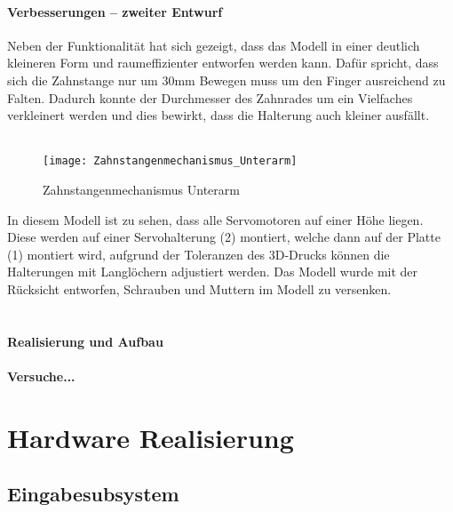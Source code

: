 \documentclass[titlepage,12pt,twoside]{article}
\begin{document}
\paragraph{Verbesserungen – zweiter Entwurf}
\hfill \break
\hfill \break
Neben der Funktionalität hat sich gezeigt, dass das Modell in einer deutlich kleineren Form und raumeffizienter entworfen werden kann. Dafür spricht, dass sich die Zahnstange nur um 30mm Bewegen muss um den Finger ausreichend zu Falten. 
Dadurch konnte der Durchmesser des Zahnrades um ein Vielfaches verkleinert werden und dies bewirkt, dass die Halterung auch kleiner ausfällt. \\
\\
\begin{figure}[H]
	\begin{center}
		\scalebox{1.2}
		{\texttt{[image: Zahnstangenmechanismus\_Unterarm]}}
		\caption{Zahnstangenmechanismus Unterarm}
		\label{fig:Zahnstangenmechanismus_Unterarm}			
	\end{center}
\end{figure}
\hfill \break
In diesem Modell ist zu sehen, dass alle Servomotoren auf einer Höhe liegen. Diese werden auf einer Servohalterung (2) montiert, welche dann auf der Platte (1) montiert wird, aufgrund der Toleranzen des 3D-Drucks können die Halterungen mit 
Langlöchern adjustiert werden. Das Modell wurde mit der Rücksicht entworfen, Schrauben und Muttern im Modell zu versenken. \\
\\

\paragraph{Realisierung und Aufbau}
\hfill \break
\hfill \break

\paragraph{Versuche...}
\hfill \break
\hfill \break

\newpage
\section{Hardware Realisierung}

\subsection{Eingabesubsystem}
\end{document}
